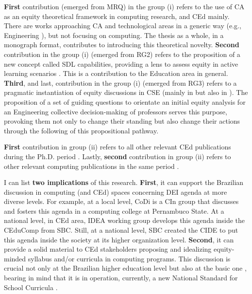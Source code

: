 \textbf{First} contribution (emerged from \gls{MRQ}) in the group (i) refers to the use of \gls{CA} as an equity theoretical framework in computing research, and \gls{CEd} mainly. There are works approaching \gls{CA} and technological areas in a generic way (e.g., Engineering \cite{fernandez:2014,odonovan:2020}), but not focusing on computing. The thesis as a whole, in a monograph format, contributes to introducing this theoretical novelty. \textbf{Second} contribution in the group (i) (emerged from \gls{RG}2) refers to the proposition of a new concept called \gls{SDL} capabilities, providing a lens to assess equity in active learning scenarios \cite{bispojr:2024-isdls}. This is a contribution to the Education area in general. \textbf{Third}, and last, contribution in the group (i) (emerged from \gls{RG}3) refers to a pragmatic instantiation of equity discussions in \gls{CSE} (mainly in \cite{bispojr:2024-online-lab} but also in \cite{bispojr:2022-educomp,bispojr:2024-nmp}). The proposition of a set of guiding
questions to orientate an initial equity analysis for an Engineering collective decision-making of professors serves this purpose, provoking them not only to change their standing but also change their actions through the following of this propositional pathway.

\textbf{First} contribution in group (ii) refers to all other relevant \gls{CEd} publications during the \gls{Ph.D.} period \cite{bispojr:2024-nmp,bispojr:2024-urca,feitosa:2024,cavalcanti:2024,pereira:2024,melo:2024-horizontes,boaventura:2024-sbgames,
boaventura:2023,esmeraldo:2023,freire:2023-rsc,freire:2023-encompif, santos:2022,bispojr:2022-educomp,esmeraldo:2022,bispojr:2021,bispojr:2021-educomp,bispojr:2021-wei,bispojr:2020-tec}. Lastly, \textbf{second} contribution in group (ii) refers to other relevant computing publications in the same period \cite{cavalcanti:2024-ieee,bispojr:2023-edi,bispojr:2023-rbie,sansil:2023,lima:2022,bispojr:2022-snee}.

I can list \textbf{two implications} of this research. \textbf{First}, it can support the Brazilian discussion in computing (and \gls{CEd}) spaces concerning \gls{DEI} agenda at more diverse levels. For example, at a local level, \gls{CoDi} is a \gls{CIn} group that discusses and fosters this agenda in a computing college at Pernambuco State. At a national level, in \gls{CEd} area, \gls{IDEA} working group \cite{pereira:2024,melo:2024-horizontes} develops this agenda inside the \gls{CEduComp} from \acrfull{SBC}. Still, at a national level, \gls{SBC} created the \gls{CIDE} to put this agenda inside the society at its higher organization level. \textbf{Second}, it can provide a solid material to \gls{CEd} stakeholders proposing and idealizing equity-minded syllabus \cite{anderson:2023,gama:2024} and/or curricula \cite{karimi:2024} in computing programs. This discussion is crucial not only at the Brazilian higher education level \cite{moro:2022} but also at the basic one \cite{falcao:2021}, bearing in mind that it is 
in operation, currently, a new National Standard for School Curricula \cite{ribeiro:2023}.

